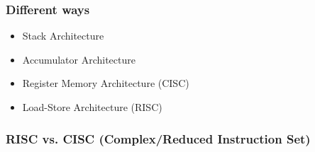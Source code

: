 \documentclass[12pt]{article}
\begin{document}
            \subsubsection{Different ways}
                \begin{itemize}
                    \item Stack Architecture
                    \item Accumulator Architecture
                    \item Register Memory Architecture (CISC)
                    \item Load-Store Architecture (RISC)
                \end{itemize}
            \subsubsection{RISC vs. CISC (Complex/Reduced Instruction Set)}
\end{document}
